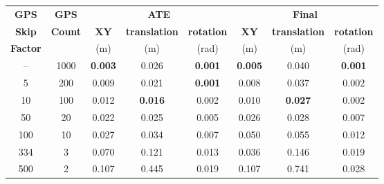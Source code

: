 \begin{table}[h]
    \centering
    {\small
        \begin{tabular}{cc|ccc|ccc}
            \hline
            \textbf{GPS}    & \textbf{GPS}   & \multicolumn{3}{c|}{\textbf{ATE}} & \multicolumn{3}{c}{\textbf{Final}}                                                                                 \\
            \textbf{Skip}   & \textbf{Count} & \textbf{XY}                       & \textbf{translation}               & \textbf{rotation} & \textbf{XY}    & \textbf{translation} & \textbf{rotation} \\
            \textbf{Factor} &                & (m)                               & (m)                                & (rad)             & (m)            & (m)                  & (rad)             \\
            \hline
            \hline
            --              & 1000           & \textbf{0.003}                    & 0.026                              & \textbf{0.001}    & \textbf{0.005} & 0.040                & \textbf{0.001}    \\
            5               & 200            & 0.009                             & 0.021                              & \textbf{0.001}    & 0.008          & 0.037                & 0.002             \\
            10              & 100            & 0.012                             & \textbf{0.016}                     & 0.002             & 0.010          & \textbf{0.027}       & 0.002             \\
            50              & 20             & 0.022                             & 0.025                              & 0.005             & 0.026          & 0.028                & 0.007             \\
            100             & 10             & 0.027                             & 0.034                              & 0.007             & 0.050          & 0.055                & 0.012             \\
            334             & 3              & 0.070                             & 0.121                              & 0.013             & 0.036          & 0.146                & 0.019             \\
            500             & 2              & 0.107                             & 0.445                              & 0.019             & 0.107          & 0.741                & 0.028             \\

\end{tabular}}
\end{table}
